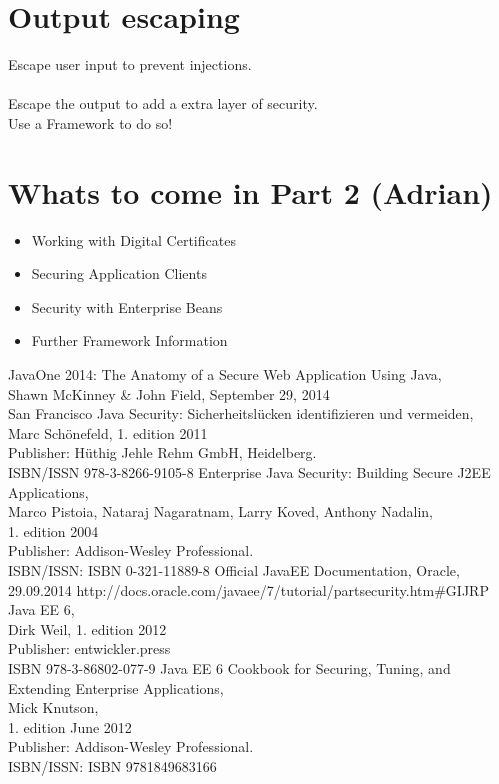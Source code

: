 \documentclass[12pt,a4paper]{report}
\begin{document}
\section{Output escaping}
Escape user input to prevent injections.\\
\\
Escape the output to add a extra layer of security.\\
Use a Framework to do so!\\

\section{Whats to come in Part 2 (Adrian)}
\begin{itemize}
	\item Working with Digital Certificates\\
	\item Securing Application Clients\\
	\item Security with Enterprise Beans\\
	\item Further Framework Information\\
\end{itemize}


\newpage
\begin{thebibliography}{99}
JavaOne 2014: The Anatomy of a Secure Web Application Using Java, \\
Shawn McKinney \& John Field, September 29, 2014\\
San Francisco
Java Security: Sicherheitslücken identifizieren und vermeiden, \\
Marc Schönefeld, 1. edition 2011\\
Publisher: Hüthig Jehle Rehm GmbH, Heidelberg. \\
ISBN/ISSN 978-3-8266-9105-8
Enterprise Java Security: Building Secure J2EE Applications,\\
Marco Pistoia, Nataraj Nagaratnam, Larry Koved, Anthony Nadalin,\\
1. edition 2004 \\
Publisher: Addison-Wesley Professional.\\
ISBN/ISSN: ISBN 0-321-11889-8
Official JavaEE Documentation, Oracle,\\
29.09.2014
http://docs.oracle.com/javaee/7/tutorial/partsecurity.htm\#GIJRP
Java EE 6,\\
Dirk Weil, 1. edition 2012\\
Publisher: entwickler.press\\
ISBN 978-3-86802-077-9
Java EE 6 Cookbook for Securing, Tuning, and Extending Enterprise Applications,\\
Mick Knutson,\\
1. edition June 2012 \\
Publisher: Addison-Wesley Professional.\\
ISBN/ISSN: ISBN 9781849683166
\end{thebibliography}
\end{document}
